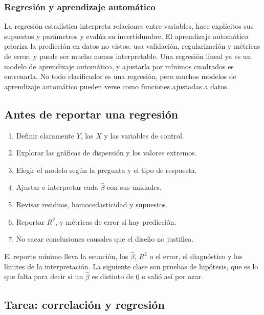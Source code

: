 \documentclass[11pt,letterpaper]{article}
\begin{document}
\subsubsection*{Regresión y aprendizaje automático}

La regresión estadística interpreta relaciones entre variables, hace
explícitos sus supuestos y parámetros y evalúa su incertidumbre. El
aprendizaje automático prioriza la predicción en datos no vistos: usa
validación, regularización y métricas de error, y puede ser mucho menos
interpretable. Una regresión lineal ya es un modelo de aprendizaje
automático, y ajustarla por mínimos cuadrados es entrenarla. No todo
clasificador es una regresión, pero muchos modelos de aprendizaje
automático pueden verse como funciones ajustadas a datos.


\subsection*{Antes de reportar una regresión}

\begin{enumerate}[label=\alph*., itemsep=0.3em]
    \item Definir claramente $Y$, las $X$ y las variables de control.
    \item Explorar las gráficas de dispersión y los valores extremos.
    \item Elegir el modelo según la pregunta y el tipo de respuesta.
    \item Ajustar e interpretar cada $\hat{\beta}$ con sus unidades.
    \item Revisar residuos, homocedasticidad y supuestos.
    \item Reportar $R^2$, y métricas de error si hay predicción.
    \item No sacar conclusiones causales que el diseño no justifica.
\end{enumerate}

El reporte mínimo lleva la ecuación, los $\hat{\beta}$, $R^2$ o el
error, el diagnóstico y los límites de la interpretación. La siguiente
clase son pruebas de hipótesis, que es lo que falta para decir si un
$\hat{\beta}$ es distinto de $0$ o salió así por azar.


\subsection*{Tarea: correlación y regresión}
\end{document}
